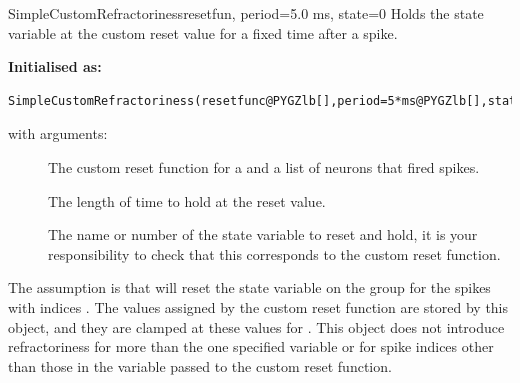 \documentclass[letterpaper,10pt,english]{manual}
\begin{document}
\hypertarget{brian.SimpleCustomRefractoriness}{}\begin{classdesc}{SimpleCustomRefractoriness}{resetfun, period=5.0 ms, state=0}
Holds the state variable at the custom reset value for a fixed time after a spike.

\textbf{Initialised as:}

\begin{Verbatim}[commandchars=@\[\]]
SimpleCustomRefractoriness(resetfunc@PYGZlb[],period=5*ms@PYGZlb[],state=0@PYGZrb[]@PYGZrb[])
\end{Verbatim}

with arguments:
\begin{description}
\item[]
The custom reset function  for  a
\hyperlink{brian.NeuronGroup}{} and  a list of neurons that
fired spikes.

\item[]
The length of time to hold at the reset value.

\item[]
The name or number of the state variable to reset and hold,
it is your responsibility to check that this corresponds to
the custom reset function.

\end{description}

The assumption is that  will reset the state
variable  on the group  for the spikes with indices
. The values assigned by the custom reset function are
stored by this object, and they are clamped at these values for
. This object does not introduce refractoriness for more
than the one specified variable  or for spike indices
other than those in the variable  passed to the custom
reset function.
\end{classdesc}
\end{document}
